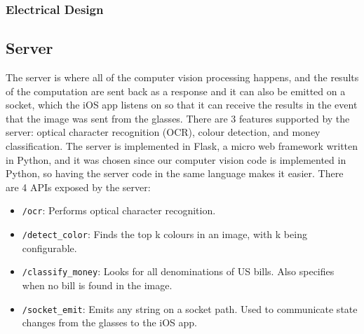 \documentclass[a4paper,11pt]{article}
\begin{document}
\subsubsection{Electrical Design}


\subsection{Server}
\label{server}
The server is where all of the computer vision processing happens, and the results of the computation are sent back as a response and it can also be emitted on a socket, which the iOS app listens on so that it can receive the results in the event that the image was sent from the glasses. There are 3 features supported by the server: optical character recognition (OCR), colour detection, and money classification. The server is implemented in Flask, a micro web framework written in Python, and it was chosen since our computer vision code is implemented in Python, so having the server code in the same language makes it easier. There are 4 APIs exposed by the server:

\begin{itemize}
    \item \texttt{/ocr}: Performs optical character recognition.
    \item \texttt{/detect\_color}: Finds the top k colours in an image, with k being configurable.
    \item \texttt{/classify\_money}: Looks for all denominations of US bills. Also specifies when no bill is found in the image.
    \item \texttt{/socket\_emit}: Emits any string on a socket path. Used to communicate state changes from the glasses to the iOS app.
\end{itemize}
\end{document}
